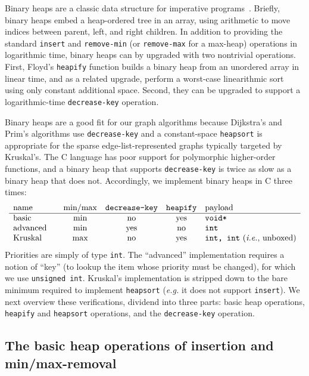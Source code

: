 \lstset{style=myTinyStyle}

Binary heaps are a classic data structure for imperative programs~\cite{CLRS,Sedgewick}.  Briefly, binary heaps embed a heap-ordered tree in an array, using arithmetic to move indices between parent, left, and right children.  In addition to providing the standard \texttt{insert} and \texttt{remove-min} (or \texttt{remove-max} for a max-heap) operations in logarithmic time, binary heaps can by upgraded with two nontrivial operations.  First, Floyd's \texttt{heapify} function builds a binary heap from an unordered array in linear time, and as a related upgrade, perform a worst-case linearithmic sort using only constant additional space.  Second, they can be upgraded to support a logarithmic-time \texttt{decrease-key} operation.

Binary heaps are a good fit for our graph algorithms because Dijkstra's and Prim's algorithms use \texttt{decrease-key} and a constant-space \texttt{heapsort} is appropriate for the sparse edge-list-represented graphs typically targeted by Kruskal's.  The C language has poor support for polymorphic higher-order functions, and a binary heap that supports \texttt{decrease-key} is twice as slow as a binary heap that does not.  Accordingly, we implement binary heaps in C three times:
\[
\begin{array}{l@{\qquad}c@{\quad}c@{\quad}c@{\quad}l}
\text{name} & \text{min/max} & \texttt{decrease-key} & \texttt{heapify} & \text{payload} \\
\hline
\text{basic} & \text{min} & \text{no} & \text{yes} & \texttt{void*} \\
\text{advanced} & \text{min} & \text{yes} & \text{no} & \texttt{int} \\
\text{Kruskal} & \text{max} & \text{no} & \text{yes} & \texttt{int, int} \text{ (\emph{i.e.}, unboxed)}
\end{array}
\]
Priorities are simply of type \texttt{int}.  The ``advanced'' implementation requires a notion of ``key'' (to lookup the item whose priority must be changed), for which we use \texttt{unsigned int}.  Kruskal's implementation is stripped down to the bare minimum required to implement \texttt{heapsort} (\emph{e.g.} it does not support \texttt{insert}).  We next overview these verifications, dividend into three parts: basic heap operations, \texttt{heapify} and \texttt{heapsort} operations, and the \texttt{decrease-key} operation.

\subsection{The basic heap operations of insertion and min/max-removal}
\label{sec:heapinsertremove}

